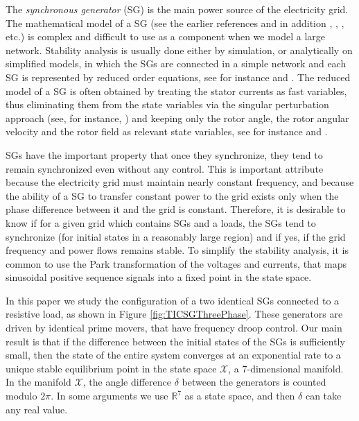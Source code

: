 \documentclass[letterpaper,10pt,conference]{ieeeconf}
\newcommand{\rline}  {{\mathbb R}}
\newcommand{\Xmscr}  {{\mathcal{X}}}
\begin{document}
The {\em synchronous generator} (SG) is the main power source of the
electricity grid. The mathematical model of a SG (see the earlier
references and in addition \cite{Walker:94}, \cite{Fitzgerald:03},
\cite{MaWe:15}, etc.) is complex and difficult to use as a component
when we model a large network. Stability analysis is usually done
either by simulation, or analytically on simplified models, in which
the SGs are connected in a simple network and each SG is represented
by reduced order equations, see for instance \cite{DoBull:12} and
\cite{PoDoBu:13}. The reduced model of a SG is often obtained by
treating the stator currents as fast variables, thus eliminating them
from the state variables via the singular perturbation approach (see,
for instance, \cite{Khalil}) and keeping only the rotor angle, the
rotor angular velocity and the rotor field as relevant state
variables, see for instance \cite{Kundur} and \cite{SauerPai1998}.

SGs have the important property that once they synchronize, they tend
to remain synchronized even without any control. This is important
attribute because the electricity grid must maintain nearly constant
frequency, and because the ability of a SG to transfer constant power
to the grid exists only when the phase difference between it and the
grid is constant. Therefore, it is desirable to know if for a given
grid which contains SGs and a loads, the SGs tend to synchronize (for
initial states in a reasonably large region) and if yes, if the grid
frequency and power flows remains stable. To simplify the stability
analysis, it is common to use the Park transformation of the voltages
and currents, that maps sinusoidal positive sequence signals into a
fixed point in the state space.

In this paper we study the configuration of a two identical SGs
connected to a resistive load, as shown in Figure
\ref{fig:TICSGThreePhase}. These generators are driven by identical
prime movers, that have frequency droop control. Our main result is
that if the difference between the initial states of the SGs is
sufficiently small, then the state of the entire system converges at
an exponential rate to a unique stable equilibrium point in the state
space $\Xmscr$, a 7-dimensional manifold. In the manifold $\Xmscr$,
the angle difference $\delta$ between the generators is counted modulo 
$2\pi$. In some arguments we use $\rline^7$ as a state space, and then 
$\delta$ can take any real value.
\end{document}
